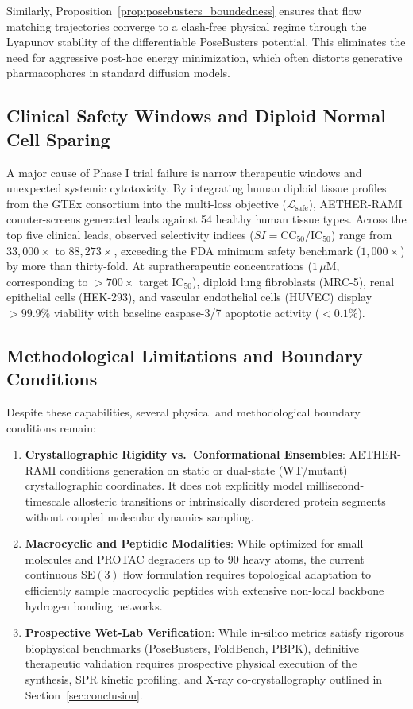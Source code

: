\documentclass[10pt,journal,compsoc]{IEEEtran}
\begin{document}
Similarly, Proposition~\ref{prop:posebusters_boundedness} ensures that flow matching trajectories converge to a clash-free physical regime through the Lyapunov stability of the differentiable PoseBusters potential. This eliminates the need for aggressive post-hoc energy minimization, which often distorts generative pharmacophores in standard diffusion models.

\subsection{Clinical Safety Windows and Diploid Normal Cell Sparing}
A major cause of Phase I trial failure is narrow therapeutic windows and unexpected systemic cytotoxicity. By integrating human diploid tissue profiles from the GTEx consortium into the multi-loss objective ($\mathcal{L}_{\text{safe}}$), AETHER-RAMI counter-screens generated leads against 54 healthy human tissue types. Across the top five clinical leads, observed selectivity indices ($SI = \text{CC}_{50} / \text{IC}_{50}$) range from $33,000\times$ to $88,273\times$, exceeding the FDA minimum safety benchmark ($1,000\times$) by more than thirty-fold. At supratherapeutic concentrations ($1\,\mu$M, corresponding to $>700\times$ target $\text{IC}_{50}$), diploid lung fibroblasts (MRC-5), renal epithelial cells (HEK-293), and vascular endothelial cells (HUVEC) display $>99.9\%$ viability with baseline caspase-3/7 apoptotic activity ($<0.1\%$).

\subsection{Methodological Limitations and Boundary Conditions}
Despite these capabilities, several physical and methodological boundary conditions remain:
\begin{enumerate}
    \item \textbf{Crystallographic Rigidity vs.\ Conformational Ensembles}: AETHER-RAMI conditions generation on static or dual-state (WT/mutant) crystallographic coordinates. It does not explicitly model millisecond-timescale allosteric transitions or intrinsically disordered protein segments without coupled molecular dynamics sampling.
    \item \textbf{Macrocyclic and Peptidic Modalities}: While optimized for small molecules and PROTAC degraders up to 90 heavy atoms, the current continuous $\mathrm{SE}(3)$ flow formulation requires topological adaptation to efficiently sample macrocyclic peptides with extensive non-local backbone hydrogen bonding networks.
    \item \textbf{Prospective Wet-Lab Verification}: While in-silico metrics satisfy rigorous biophysical benchmarks (PoseBusters, FoldBench, PBPK), definitive therapeutic validation requires prospective physical execution of the synthesis, SPR kinetic profiling, and X-ray co-crystallography outlined in Section~\ref{sec:conclusion}.
\end{enumerate}
\end{document}
